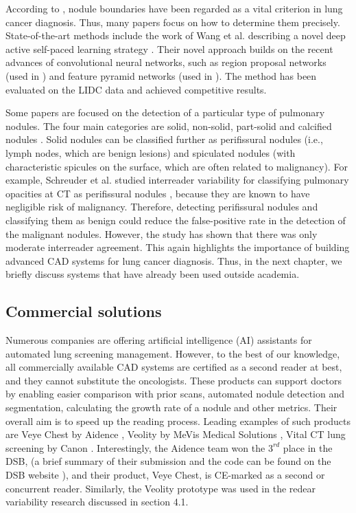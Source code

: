 \documentclass[12pt]{article}
\begin{document}
According to \citep{gonccalves2016hessian}, nodule boundaries have been regarded as a vital criterion in lung cancer diagnosis. Thus, many papers focus on how to determine them precisely. State-of-the-art methods include the work of Wang et al. describing a novel deep active self-paced learning strategy \citep{wang2018deep}. Their novel approach builds on the recent advances of convolutional neural networks, such as region proposal networks (used in \citep{liao2017evaluate}) and feature pyramid networks (used in \citep{wang2018automated}). The method has been evaluated on the LIDC data and achieved competitive results. 

Some papers are focused on the detection of a particular type of pulmonary nodules. The four main categories are solid, non-solid, part-solid and calcified nodules \citep{ciompi2017towards}. Solid nodules can be classified further as perifissural nodules (i.e., lymph nodes, which are benign lesions) and spiculated nodules (with characteristic spicules on the surface, which are often related to malignancy).
For example, Schreuder et al.  studied interreader variability for classifying pulmonary opacities at CT as perifissural nodules \citep{schreuder2018classification}, because they are known to have negligible risk of malignancy. Therefore, detecting perifissural nodules and classifying them as benign could reduce the false-positive rate in the detection of the malignant nodules. However, the study has shown that there was only moderate interreader agreement. This again highlights the importance of building advanced CAD systems for lung cancer diagnosis. Thus, in the next chapter, we briefly discuss systems that have already been used outside academia. 

\subsection{Commercial solutions}
Numerous companies are offering artificial intelligence (AI) assistants for automated lung screening management. However, to the best of our knowledge, all commercially available CAD systems are certified as a second reader at best, and they cannot substitute the oncologists. These products can support doctors by enabling easier comparison with prior scans, automated nodule detection and segmentation, calculating the growth rate of a nodule and other metrics. Their overall aim is to speed up the reading process. Leading examples of such products are Veye Chest by Aidence \citep{aidence}, Veolity by MeVis Medical Solutions \citep{veolity}, Vital CT lung screening by Canon \citep{vital}. Interestingly, the Aidence team won  the $3^{rd}$ place in the DSB, (a brief summary of their submission and the code can be found on the DSB website \citep{top10}), and their product, Veye Chest, is CE-marked as a second or concurrent reader. Similarly, the Veolity prototype was used in the redear variability research \citep{schreuder2018classification} discussed in section 4.1. 
\end{document}
